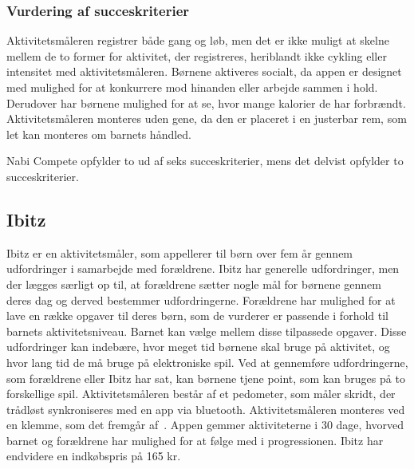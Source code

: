 \subsubsection{Vurdering af succeskriterier}
Aktivitetsmåleren registrer både gang og løb, men det er ikke muligt at skelne mellem de to former for aktivitet, der registreres, heriblandt ikke cykling eller intensitet med aktivitetsmåleren. 
Børnene aktiveres socialt, da appen er designet med mulighed for at konkurrere mod hinanden eller arbejde sammen i hold. Derudover har børnene mulighed for %
at se, hvor mange kalorier de har forbrændt. Aktivitetsmåleren monteres uden gene, da den er placeret i en justerbar rem, som let kan monteres om barnets håndled.

Nabi Compete opfylder to ud af seks succeskriterier, mens det delvist opfylder to succeskriterier.

\subsection{Ibitz}
Ibitz er en aktivitetsmåler, som appellerer til børn over fem år gennem udfordringer i samarbejde med forældrene. Ibitz har generelle udfordringer, men der lægges særligt op til, at forældrene sætter nogle mål for børnene gennem deres dag og derved bestemmer udfordringerne. Forældrene har mulighed for at lave en række opgaver til deres børn, som de vurderer er passende i forhold til barnets aktivitetsniveau. Barnet kan vælge mellem disse tilpassede opgaver. \newline
Disse udfordringer kan indebære, hvor meget tid børnene skal bruge på aktivitet, og hvor lang tid de må bruge på elektroniske spil. Ved at gennemføre udfordringerne, som forældrene eller Ibitz har sat, kan børnene tjene point, som kan bruges på to forskellige spil. \newline
Aktivitetsmåleren består af et pedometer, som måler skridt, der trådløst synkroniseres med en app via bluetooth. Aktivitetsmåleren monteres ved en klemme, som det fremgår af~. Appen gemmer aktiviteterne i 30 dage, hvorved barnet og forældrene har mulighed for at følge med i progressionen. 
Ibitz har endvidere en indkøbspris på 165 kr. \citep{Ibitz_features2016}

